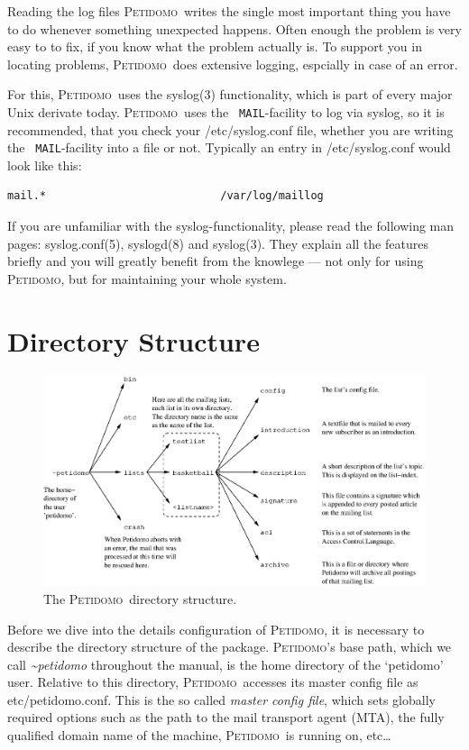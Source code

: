 \documentclass[a4paper,10pt]{scrreprt}
\newcommand{\Petidomo}{{\scshape Peti\-domo}}
\newcommand{\Def}[1]{{\sl #1}}
\newcommand{\file}[1]{{\sf #1}}
\begin{document}
Reading the log files \Petidomo\ writes the single most important
thing you have to do whenever something unexpected happens. Often
enough the problem is very easy to to fix, if you know what the
problem actually is. To support you in locating problems, \Petidomo\
does extensive logging, espcially in case of an error.

For this, \Petidomo\ uses the syslog(3) functionality, which is part
of every major Unix derivate today. \Petidomo\ uses the {\tt
MAIL}-facility to log via syslog, so it is recommended, that you check
your \file{/etc/syslog.conf} file, whether you are writing the {\tt
MAIL}-facility into a file or not. Typically an entry in
\file{/etc/syslog.conf} would look like this:
\begin{verbatim}
mail.*                           /var/log/maillog
\end{verbatim}

If you are unfamiliar with the syslog-functionality, please read the
following man pages: syslog.conf(5), syslogd(8) and syslog(3). They
explain all the features briefly and you will greatly benefit from the
knowlege --- not only for using \Petidomo, but for maintaining your
whole system.

\section{Directory Structure}

\begin{figure}[bth]
\begin{center}
\includegraphics[width=\textwidth]{directory-struct.eps}
\caption{The \Petidomo\ directory structure.}
\label{directory structure}
\end{center}
\end{figure}

Before we dive into the details configuration of \Petidomo, it is
necessary to describe the directory structure of the package.
\Petidomo's base path, which we call \Def{\~{}petidomo} throughout the
manual, is the home directory of the `petidomo' user. Relative to this
directory, \Petidomo\ accesses its master config file as
\file{etc/petidomo.conf}. This is the so called \Def{master config
file}, which sets globally required options such as the path to the
mail transport agent (MTA), the fully qualified domain name of the
machine, \Petidomo\ is running on, etc\dots{}
\end{document}
